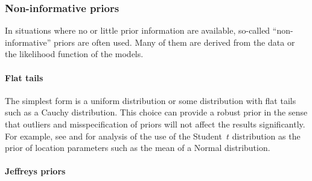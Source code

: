 \subsubsection{Non-informative priors}
\label{ssub:Non-informative priors}

In situations where no or little prior information are available, so-called
``non-informative'' priors are often used. Many of them are derived from the
data or the likelihood function of the models.

\paragraph{Flat tails}

The simplest form is a uniform distribution or some distribution with flat
tails such as a Cauchy distribution. This choice can provide a robust prior
in the sense that outliers and misspecification of priors will not affect the
results significantly. For example, see \cite{OHagan:1990vx} and
\cite{Fan:1992vx} for analysis of the use of the Student~$t$ distribution as
the prior of location parameters such as the mean of a Normal distribution.

\paragraph{Jeffreys priors}


